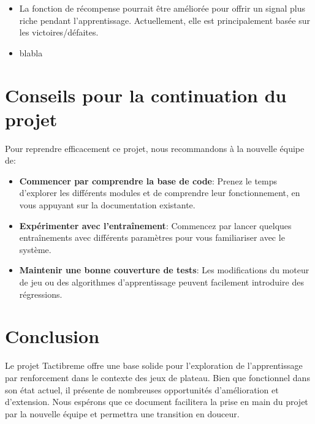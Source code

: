 \documentclass[]{article}
\begin{document}
\begin{itemize}
  \item La fonction de récompense pourrait être améliorée pour offrir un signal plus riche pendant l'apprentissage. Actuellement, elle est principalement basée sur les victoires/défaites.
  \item blabla %
\end{itemize}

\section{Conseils pour la continuation du projet}

Pour reprendre efficacement ce projet, nous recommandons à la nouvelle équipe de:

\begin{itemize}
  \item \textbf{Commencer par comprendre la base de code}: Prenez le temps d'explorer les différents modules et de comprendre leur fonctionnement, en vous appuyant sur la documentation existante.
  \item \textbf{Expérimenter avec l'entraînement}: Commencez par lancer quelques entraînements avec différents paramètres pour vous familiariser avec le système.
  \item \textbf{Maintenir une bonne couverture de tests}: Les modifications du moteur de jeu ou des algorithmes d'apprentissage peuvent facilement introduire des régressions.
\end{itemize}

\section{Conclusion}

Le projet Tactibreme offre une base solide pour l'exploration de l'apprentissage par renforcement dans le contexte des jeux de plateau. Bien que fonctionnel dans son état actuel, il présente de nombreuses opportunités d'amélioration et d'extension. Nous espérons que ce document facilitera la prise en main du projet par la nouvelle équipe et permettra une transition en douceur.
\end{document}
